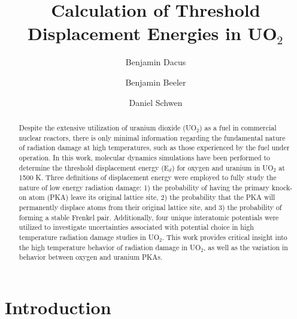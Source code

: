 \documentclass[review]{elsarticle}
\begin{document}
\begin{frontmatter}


\title{Calculation of Threshold Displacement Energies in UO$_2$}



\author[ncst]{Benjamin Dacus}
\author[inl]{Benjamin Beeler}
\author[inl]{Daniel Schwen}
\address[inl]{Idaho National Laboratory, Idaho Falls, ID 83415}
\address[ncst]{North Carolina State University, Raleigh, NC 27695}





  \begin{abstract}
   Despite the extensive utilization of uranium dioxide (UO$_2$) as a fuel in commercial nuclear reactors, there is only minimal information regarding the fundamental nature of radiation damage at high temperatures, such as those experienced by the fuel under operation. In this work, molecular dynamics simulations have been performed to determine the threshold displacement energy (E$_d$) for oxygen and uranium in UO$_2$ at 1500 K. Three definitions of displacement energy were employed to fully study the nature of low energy radiation damage: 1) the probability of having the primary knock-on atom (PKA) leave its original lattice site, 2) the probability that the PKA will permanently displace atoms from their original lattice site, and 3) the probability of forming a stable Frenkel pair. Additionally, four unique interatomic potentials were utilized to investigate uncertainties associated with potential choice in high temperature radiation damage studies in UO$_2$. This work provides critical insight into the high temperature behavior of radiation damage in UO$_2$, as well as the variation in behavior between oxygen and uranium PKAs.
  \end{abstract}


\end{frontmatter}

\clearpage
\newpage

\section{Introduction}
\end{document}
